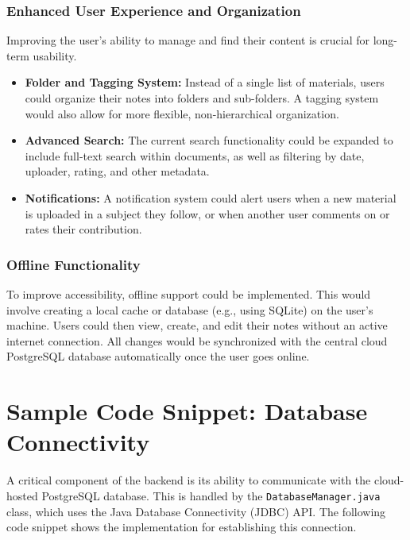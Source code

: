 \documentclass[12pt, a4paper]{report}
\begin{document}
\begin{itemize}
\subsection{Enhanced User Experience and Organization}
Improving the user's ability to manage and find their content is crucial for long-term usability.
\begin{itemize}
    \item \textbf{Folder and Tagging System:} Instead of a single list of materials, users could organize their notes into folders and sub-folders. A tagging system would also allow for more flexible, non-hierarchical organization.
    \item \textbf{Advanced Search:} The current search functionality could be expanded to include full-text search within documents, as well as filtering by date, uploader, rating, and other metadata.
    \item \textbf{Notifications:} A notification system could alert users when a new material is uploaded in a subject they follow, or when another user comments on or rates their contribution.
\end{itemize}

\subsection{Offline Functionality}
To improve accessibility, offline support could be implemented. This would involve creating a local cache or database (e.g., using SQLite) on the user's machine. Users could then view, create, and edit their notes without an active internet connection. All changes would be synchronized with the central cloud PostgreSQL database automatically once the user goes online.
\appendix
\chapter{Sample Code Snippet: Database Connectivity}

A critical component of the backend is its ability to communicate with the cloud-hosted PostgreSQL database. This is handled by the \texttt{DatabaseManager.java} class, which uses the Java Database Connectivity (JDBC) API. The following code snippet shows the implementation for establishing this connection.


\end{itemize}
\end{document}
